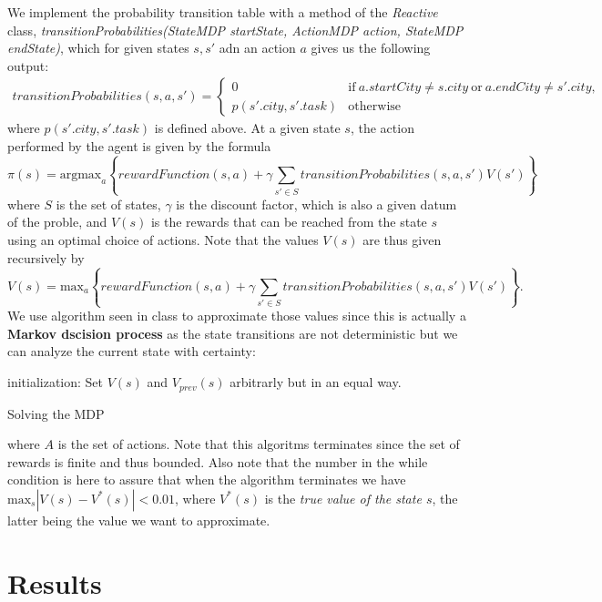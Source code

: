 \documentclass[11pt]{article}
\begin{document}
We implement the probability transition table with a method of the \emph{Reactive} class, \emph{transitionProbabilities(StateMDP startState, ActionMDP action, StateMDP endState)}, which for given states $s,s'$ adn an action $a$ gives us the following output:
	\begin{align*}
		transitionProbabilities(s,a,s')=
			\begin{cases}
				0 & \mathrm{if}\ a.startCity\neq s.city\ \mathrm{or}\ a.endCity\neq s'.city,\\
				p(s'.city,s'.task) & \mathrm{otherwise}
			\end{cases}
	\end{align*}
where $p(s'.city,s'.task)$ is defined above.
At a given state $s$, the action performed by the agent is given by the formula $$\pi(s)=\mathrm{argmax}_a\left\{rewardFunction(s,a)+\gamma\sum\limits_{s'\in S}transitionProbabilities(s,a,s')V(s')\right\}$$ where $S$ is the set of states, $\gamma$ is the discount factor, which is also a given datum of the proble, and $V(s)$ is the rewards that can be reached from the state $s$ using an optimal choice of actions. Note that the values $V(s)$ are thus given recursively by $$V(s) = \mathrm{max}_a\left\{rewardFunction(s,a)+\gamma\sum\limits_{s'\in S}transitionProbabilities(s,a,s')V(s')\right\}.$$ We use algorithm seen in class to approximate those values since this is actually a \textbf{Markov dscision process} as the state transitions are not deterministic but we can analyze the current state with certainty:
	\begin{algorithm}[H]
		\SetAlgoLined
	 	initialization: Set $V(s)$ and $V_{prev}(s)$ arbitrarly but in an equal way.\\	
		\caption{Solving the MDP}
	\end{algorithm}
where $A$ is the set of actions. Note that this algoritms terminates since the set of rewards is finite and thus bounded. Also note that the number in the while condition is here to assure that when the algorithm terminates we have $\mathrm{max}_s|V(s)-V^*(s)| < 0.01$, where $V^*(s)$ is the \emph{true value of the state $s$}, the latter being the value we want to approximate.

\section{Results}
\end{document}
